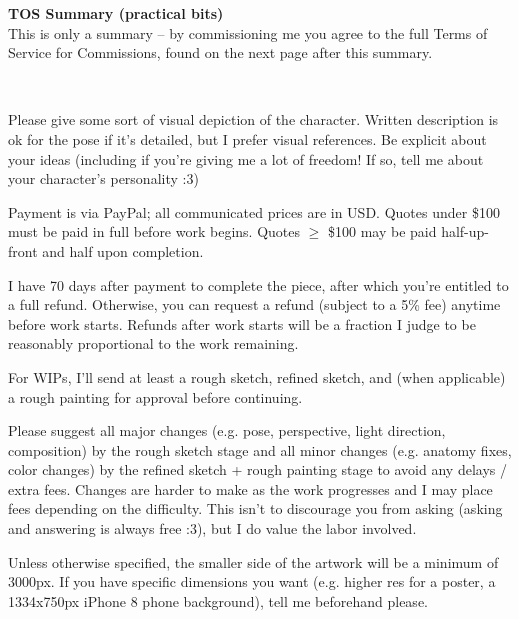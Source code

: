 \documentclass{article}
\newcommand{\hsp}[1][5]{\hspace{0.#1 cm}}
\newcommand{\hcm}[1][1]{\hspace{#1 cm}}
\begin{document}
\begin{center}
	\parbox{12cm}{
		\begin{center}
			\textbf{\large TOS Summary (practical bits)}\\[12pt]

			This is only a summary -- by commissioning me you agree to the full Terms of Service for Commissions, found on the next page after this summary.
		\end{center}
	}
\end{center}

\begin{flushleft}
\hcm\\

\begin{center}
	\parbox{14cm}{
		Please give some sort of visual depiction of the character. Written description is ok for the pose if it's detailed, but I prefer visual references. Be explicit about your ideas (including if you're giving me a lot of freedom! If so, tell me about your character's personality :3)\\\hcm

		Payment is via PayPal; all communicated prices are in USD. Quotes under \$100 must be paid in full before work begins. Quotes $\geq$ \$100 may be paid half-up-front and half upon completion.\\\hcm

		I have 70 days after payment to complete the piece, after which you're entitled to a full refund. Otherwise, you can request a refund (subject to a 5\% fee) anytime before work starts. Refunds after work starts will be a fraction I judge to be reasonably proportional to the work remaining.\\\hsp

		For WIPs, I'll send at least a rough sketch, refined sketch, and (when applicable) a rough painting for approval before continuing.\\\hcm

		Please suggest all major changes (e.g. pose, perspective, light direction, composition) by the rough sketch stage and all minor changes (e.g. anatomy fixes, color changes) by the refined sketch + rough painting stage to avoid any delays / extra fees. Changes are harder to make as the work progresses and I may place fees depending on the difficulty. This isn't to discourage you from asking (asking and answering is always free :3), but I do value the labor involved.\\\hcm

		Unless otherwise specified, the smaller side of the artwork will be a minimum of 3000px. If you have specific dimensions you want (e.g. higher res for a poster, a 1334x750px iPhone 8 phone background), tell me beforehand please.\\\hcm

}
\end{center}
\end{flushleft}
\end{document}

